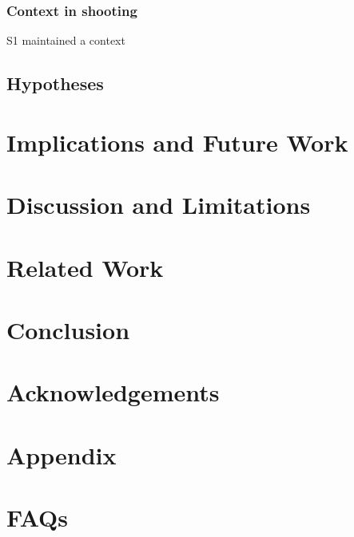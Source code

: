 \subsubsection{Context in shooting} S1 maintained a context 
\subsection{Hypotheses}

\section{Implications and Future Work}

\section{Discussion and Limitations}

\section{Related Work}

\section{Conclusion}

\section{Acknowledgements}

\section{Appendix}

\section{FAQs}